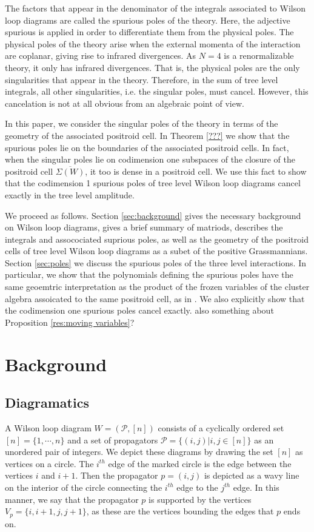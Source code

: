 \documentclass[11pt]{article}
\newcommand{\cP}{\mathcal{P}}
\theoremstyle{remark}
\theoremstyle{definition}
\begin{document}
The factors that appear in the denominator of the integrals associated to Wilson loop diagrams are called the spurious poles of the theory. Here, the adjective spurious is applied in order to differentiate them from the physical poles. The physical poles of the theory arise when the external momenta of the interaction are coplanar, giving rise to infrared divergences. As $N=4$ is a renormalizable theory, it only has infrared divergences. That is, the physical poles are the only singularities that appear in the theory. Therefore, in the sum of tree level integrals, all other singularities, i.e. the singular poles, must cancel. However, this cancelation is not at all obvious from an algebraic point of view. 

In this paper, we consider the singular poles of the theory in terms of the geometry of the associated positroid cell. In Theorem \ref{???} we show that the spurious poles lie on the boundaries of the associated positroid cells. In fact, when the singular poles lie on codimension one subspaces of the closure of the positroid cell $\overline{\Sigma(W)}$, it too is dense in a positroid cell. We use this fact to show that the codimension 1 spurious poles of tree level Wilson loop diagrams cancel exactly in the tree level amplitude. 

We proceed as follows. Section \ref{sec:background} gives the necessary background on Wilson loop diagrams, gives a brief summary of matriods, describes the integrals and assocociated suprious poles, as well as the geometry of the positroid cells of tree level Wilson loop diagrams as a subet of the positive Grassmannians. Section \ref{sec:poles} we discuss the spurious poles of the three level interactions. In particular, we show that the polynomials defining the spurious poles have the same geoemtric interpretation as the product of the frozen variables of the cluster algebra assoicated to the same positroid cell, as in \cite{SS-BW, LamGalashin}. We also explicitly show that the codimension one spurious poles cancel exactly. {\color{red} also something about Proposition \ref{res:moving variables}?}


 

\section{Background \label{sec:background}}

\subsection{Diagramatics \label{sec:diagramdefs}}
A Wilson loop diagram $W = (\cP, [n])$ consists of a cyclically ordered set $[n] = \{1, \cdots, n\}$ and a set of propagators $\cP = \{(i,j) | i, j \in [n]\}$ as an unordered pair of integers. We depict these diagrams by drawing the set $[n]$ as vertices on a circle. The $i^{th}$ edge of the marked circle is the edge between the vertices $i$ and $i+1$. Then the propagator $p =(i,j)$ is depicted as a wavy line on the interior of the circle connecting the $i^{th}$ edge to the $j^{th}$ edge. In this manner, we say that the propagator $p$ is supported by the vertices $V_p = \{i, i+1, j, j+1\}$, as these are the vertices bounding the edges that $p$ ends on. 
\end{document}
